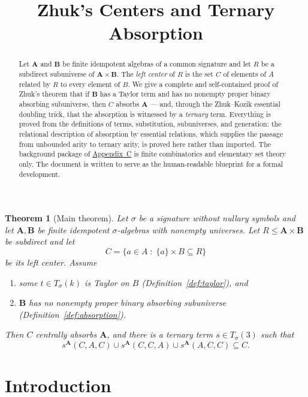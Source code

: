\documentclass[11pt]{article}
\title{Zhuk's Centers and Ternary Absorption}
\author{}\date{}
\theoremstyle{mainplain}
\newtheorem{theorem}{Theorem}[section]
\theoremstyle{mainroman}
\theoremstyle{definition}
\newcommand{\alphlabels}{\renewcommand{\labelenumi}{\textup{(\alph{enumi})}}%
  \renewcommand{\theenumi}{\alph{enumi}}}
\providecommand{\tightlist}{\setlength{\itemsep}{0pt}\setlength{\parskip}{0pt}}
\numberwithin{equation}{section}
\newcommand{\bA}{\mathbf A}
\newcommand{\bB}{\mathbf B}
\newcommand{\Tm}{T_\sigma}
\begin{document}
\maketitle\vspace{-2.2em}
\begin{abstract}
Let $\bA$ and $\bB$ be finite idempotent algebras of a common signature and let
$R$ be a subdirect subuniverse of $\bA\times\bB$. The \emph{left center} of $R$
is the set $C$ of elements of $A$ related by $R$ to every element of $B$. We
give a complete and self-contained proof of Zhuk's theorem that if $\bB$ has a
Taylor term and has no nonempty proper binary absorbing subuniverse, then $C$
absorbs $\bA$ --- and, through the Zhuk--Kozik essential doubling trick, that the
absorption is witnessed by a \emph{ternary} term. Everything is proved from the
definitions of terms, substitution, subuniverses, and generation: the relational
description of absorption by essential relations, which supplies the passage
from unbounded arity to ternary arity, is proved here rather than imported. The background
package of \hyperref[app:background]{Appendix~C} is finite combinatorics and
elementary set theory only. The document is written to serve as the
human-readable blueprint for a formal development.
\end{abstract}

\begin{theorem}[Main theorem]\label{thm:main}
Let $\sigma$ be a signature without nullary symbols and let $\bA,\bB$ be finite
idempotent $\sigma$-algebras with nonempty universes. Let $R\le\bA\times\bB$ be
subdirect and let
\[
  C=\{a\in A\;:\;\{a\}\times B\subseteq R\}
\]
be its left center. Assume
\begin{enumerate}\alphlabels\tightlist
\item some $t\in\Tm(k)$ is Taylor on $B$ \textup{(Definition~\ref{def:taylor})}, and
\item $\bB$ has no nonempty proper binary absorbing subuniverse
      \textup{(Definition~\ref{def:absorption})}.
\end{enumerate}
Then $C$ centrally absorbs $\bA$, and there is a \emph{ternary} term
$s\in\Tm(3)$ such that
\[
 s^{\bA}(C,A,C)\cup s^{\bA}(C,C,A)\cup s^{\bA}(A,C,C)\subseteq C .
\]
\end{theorem}

\tableofcontents\clearpage

\section*{Introduction}
\end{document}
